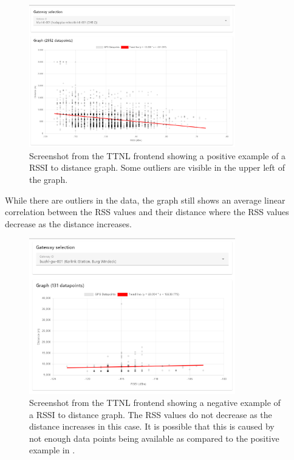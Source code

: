 \begin{figure}[htbp]
    \centering
    \includegraphics[width=0.8\textwidth]{pictures/ttn-locator/frontend/data/gateway_ghb_rssi_range_graph.png}
    \caption[Screenshot from the \acl{TTNL} frontend showing a positive example of a \acl{RSSI} to distance graph]{
        Screenshot from the \ac{TTNL} frontend showing a positive example of a \ac{RSSI} to distance graph.
        Some outliers are visible in the upper left of the graph.
    }\label{fig:rssi-range-graph-positive-example}
\end{figure}

While there are outliers in the data, the graph still shows an average linear correlation between the \ac{RSS} values and their distance where the \ac{RSS} values decrease as the distance increases.

\begin{figure}[htbp]
    \centering
    \includegraphics[width=0.8\textwidth]{pictures/ttn-locator/frontend/data/gateway_buehl_gw_rssi_range_graph.png}
    \caption[Screenshot from the \acl{TTNL} frontend showing a negative example of a \acl{RSSI} to distance graph]{
        Screenshot from the \ac{TTNL} frontend showing a negative example of a \ac{RSSI} to distance graph.
        The \ac{RSS} values do not decrease as the distance increases in this case.
        It is possible that this is caused by not enough data points being available as compared to the positive example in .
    }\label{fig:rssi-range-graph-negative-example}
\end{figure}

